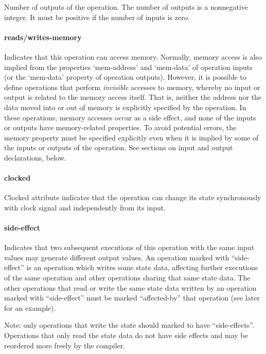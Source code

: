 \documentclass[a4paper,twoside]{tceusermanual}
\begin{document}
Number of outputs of the operation. The number of outputs is a
nonnegative integer. It must be positive if the number of inputs is
zero.

\paragraph{reads/writes-memory}

Indicates that this operation can access memory.  Normally, memory access is
also implied from the properties `mem-address' and `mem-data' of operation
inputs (or the `mem-data' property of operation outputs).  However, it is
possible to define operations that perform \emph{invisible} accesses to
memory, whereby no input or output is related to the memory access itself.
That is, neither the address nor the data moved into or out of memory is
explicitly specified by the operation.  In these operations, memory accesses
occur as a side effect, and none of the inputs or outputs have
memory-related properties.  To avoid potential errors, the memory property
must be specified explicitly even when it is implied by some of the inputs
or outputs of the operation.  See sections on input and output declarations,
below.

\paragraph{clocked}
Clocked attribute indicates that the operation can change its state
synchronously with clock signal and independently from its input.

\paragraph{side-effect}

Indicates that two subsequent executions of this operation with the same
input values may generate different output values.  An operation marked with
``side-effect'' is an operation which writes some state data, affecting
further executions of the same operation and other operations sharing
that same state data. The other operations that read or write
the same state data written by an operation marked with ``side-effect'' 
must be marked ``affected-by'' that operation (see later for an example).

Note: only operations that write the state should marked to
have ``side-effects''. Operations that only read the state data do not
have side effects and may be reordered more freely by the compiler.
\end{document}
